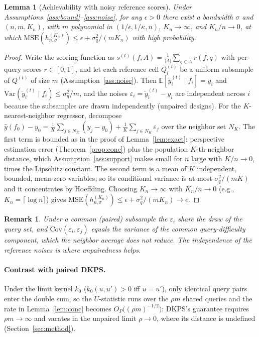 \documentclass{article}
\newtheorem{lemma}{Lemma}
\newtheorem{remark}{Remark}
\theoremstyle{definition}
\theoremstyle{plain}
\begin{document}
\begin{lemma}[Achievability with noisy reference scores]
\label{lem:noisy}
Under Assumptions~\ref{ass:bound}--\ref{ass:noise}, for any $\epsilon>0$ there exist
a bandwidth $\sigma$ and $(n,m,K_{n})$, with $m$ polynomial in
$(1/\epsilon,1/\kappa,n)$, $K_{n}\to\infty$, and $K_{n}/n\to0$, at which
$\mathrm{MSE}(h_{n,\sigma}^{(K_{n})})\le\epsilon+\sigma_q^2/(mK_{n})$ with high
probability.
\end{lemma}
\begin{proof}
Write the scoring function as
$s^{(t)}(f,A)=\tfrac{1}{|A|}\sum_{q\in A}r(f,q)$ with per-query scores
$r\in[0,1]$, and let each reference cell $Q_{i}^{(t)}$ be a uniform subsample of
$Q^{(t)}$ of size $m$ (Assumption~\ref{ass:noise}). Then
$\mathbb{E}[\tilde{y}_{i}^{(t)}\mid f_{i}]=y_{i}$ and
$\mathrm{Var}(\tilde{y}_{i}^{(t)}\mid f_{i})\le\sigma_q^2/m$, and the noises
$\varepsilon_{i}=\tilde{y}_{i}^{(t)}-y_{i}$ are independent across $i$ because
the subsamples are drawn independently (unpaired designs). For the $K$-nearest-neighbor regressor, decompose
$\hat y(f_{0})-y_{0}=\tfrac1K\sum_{j\in N_K}(y_{j}-y_{0})+\tfrac1K\sum_{j\in
N_K}\varepsilon_{j}$ over the neighbor set $N_K$. The first term is bounded as in
the proof of Lemma~\ref{lem:exact}: perspective estimation error
(Theorem~\ref{prop:conc}) plus the population $K$-th-neighbor distance, which
Assumption~\ref{ass:support} makes small for $n$ large with $K/n\to0$, times the
Lipschitz constant. The second term is a mean of $K$ independent, bounded,
mean-zero variables, so its conditional variance is at most $\sigma_q^2/(mK)$ and
it concentrates by Hoeffding. Choosing $K_{n}\to\infty$ with $K_{n}/n\to0$ (e.g.,
$K_{n}=\lceil\log n\rceil$) gives
$\mathrm{MSE}(h_{n,\sigma}^{(K_{n})})\le\epsilon+\sigma_q^2/(mK_{n})\to\epsilon$.
\end{proof}
\begin{remark}
Under a common (paired) subsample the $\varepsilon_{i}$ share the draw of the query
set, and $\mathrm{Cov}(\varepsilon_{i},\varepsilon_{j})$ equals the variance of the
common query-difficulty component, which the neighbor average does not reduce. The
independence of the reference noises is where unpairedness \emph{helps}.
\end{remark}

\paragraph{Contrast with paired DKPS.} Under the limit kernel $k_{0}$
($k_{0}(u,u')>0$ iff $u=u'$), only identical query pairs enter the double sum, so the
$U$-statistic runs over the $\rho m$ shared queries
and the rate in Lemma~\ref{lem:conc} becomes $O_P\big((\rho m)^{-1/2}\big)$: DKPS's
guarantee requires $\rho m\to\infty$ and vacates in the unpaired limit $\rho\to0$,
where its distance is undefined (Section~\ref{sec:method}).
\end{document}
